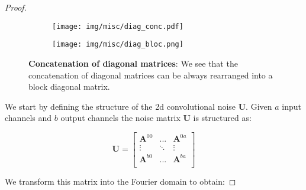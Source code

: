 \documentclass{article} %
\theoremstyle{definition}
\begin{document}
\begin{proof}

\begin{figure*}[t!]
\centering
\begin{subfigure}{.5\textwidth}
  \centering
  \texttt{[image: img/misc/diag\_conc.pdf]}
  \caption{}
\end{subfigure}%
\begin{subfigure}{.5\textwidth}
  \centering
  \texttt{[image: img/misc/diag\_bloc.png]}
  \caption{}
\end{subfigure}
\caption{\textbf{Concatenation of diagonal matrices}: We see that the concatenation of diagonal matrices can be always rearranged into a block diagonal matrix.}
\end{figure*}

We start by defining the structure of the 2d convolutional noise $\boldsymbol{U}$. Given $a$ input channels and $b$ output channels the noise matrix $\boldsymbol{U}$ is structured as:

\begin{equation}
\boldsymbol{U} = 
\begin{bmatrix}
    \boldsymbol{A}^{00}  & ... & \boldsymbol{A}^{0a}  \\
    \vdots  & \ddots & \vdots  \\
    \boldsymbol{A}^{b0}  & ... & \boldsymbol{A}^{ba}  \\
\end{bmatrix}
\end{equation}

We transform this matrix into the Fourier domain to obtain:


\end{proof}
\end{document}
